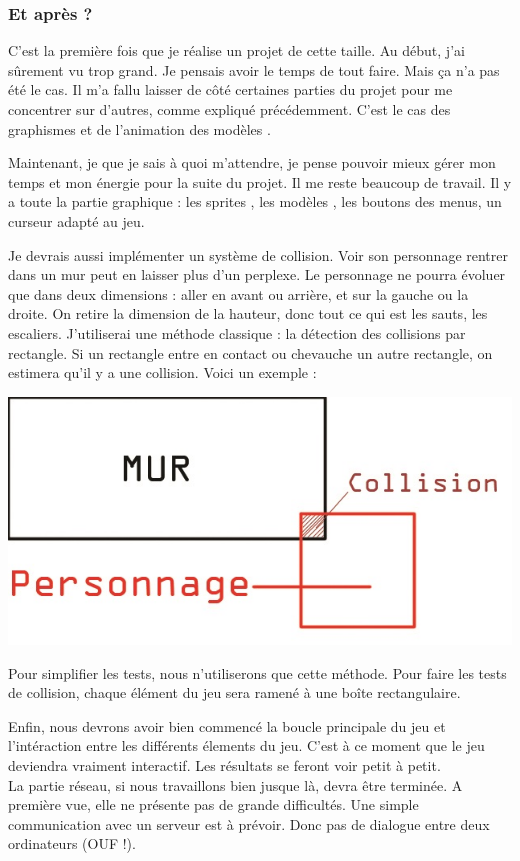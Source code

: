 \documentclass{article}
\begin{document}
\subsubsection{Et après ?}
\par
C'est la première fois que je réalise un projet de cette taille. Au début, j'ai sûrement vu trop grand. Je pensais avoir le temps de tout faire. Mais ça n'a pas été le cas. Il m'a fallu laisser de côté certaines parties du projet pour me concentrer sur d'autres, comme expliqué précédemment. C'est le cas des graphismes et de l'animation des modèles . 
\newline

\par
Maintenant, je que je sais à quoi m'attendre, je pense pouvoir mieux gérer mon temps et mon énergie pour la suite du projet. Il me reste beaucoup de travail. Il y a toute la partie graphique : les sprites , les modèles , les boutons des menus, un curseur adapté au jeu.


\par
Je devrais aussi implémenter un système de collision. Voir son personnage rentrer dans un mur peut en laisser plus d'un perplexe. Le personnage ne pourra évoluer que dans deux dimensions : aller en avant ou arrière, et sur la gauche ou la droite. On retire la dimension de la hauteur, donc tout ce qui est les sauts, les escaliers. J'utiliserai une méthode classique : la détection des collisions par rectangle. Si un rectangle entre en contact ou chevauche un autre rectangle, on estimera qu'il y a une collision. Voici un exemple : 

 \begin{center}
\includegraphics[scale=0.5]{collision}
\end{center}

Pour simplifier les tests, nous n'utiliserons que cette méthode. Pour faire les tests de collision, chaque élément du jeu sera ramené à une boîte rectangulaire. \\
\par
Enfin, nous devrons avoir bien commencé la boucle principale du jeu et l'intéraction entre les différents élements du jeu. C'est à ce moment que le jeu deviendra vraiment interactif. Les résultats se feront voir petit à petit. 
\\
La partie réseau, si nous travaillons bien jusque là, devra être terminée. A première vue, elle ne présente pas de grande difficultés. Une simple communication avec un serveur est à prévoir. Donc pas de dialogue entre deux ordinateurs (OUF !).
\newpage
\end{document}
